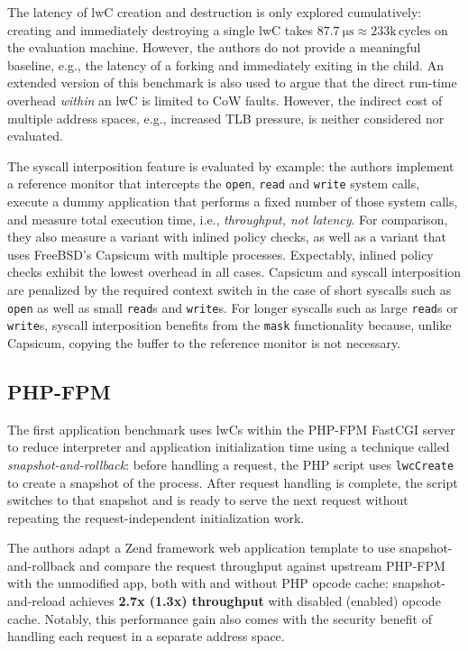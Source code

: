 \documentclass[10pt,twocolumn,a4paper]{article}
\begin{document}
The latency of lwC creation and destruction is only explored cumulatively: creating and immediately destroying a single lwC takes $\SI{87.7}{\micro\second} \approx 233\text{k}\,\text{cycles}$ on the evaluation machine. %
However, the authors do not provide a meaningful baseline, e.g., the latency of a forking and immediately exiting in the child.
An extended version of this benchmark is also used to argue that the direct run-time overhead \textit{within} an lwC is limited to CoW faults.
However, the indirect cost of multiple address spaces, e.g., increased TLB pressure, is neither considered nor evaluated.
\cite{lwcpaper}

The syscall interposition feature is evaluated by example:
the authors implement a reference monitor that intercepts the \lstinline{open}, \lstinline{read} and \lstinline{write} system calls, execute a dummy application that performs a fixed number of those system calls, and measure total execution time, i.e., \textit{throughput, not latency}.
For comparison, they also measure a variant with inlined policy checks, as well as a variant that uses FreeBSD's Capsicum with multiple processes.
Expectably, inlined policy checks exhibit the lowest overhead in all cases.
Capsicum and syscall interposition are penalized by the required context switch in the case of short syscalls such as \lstinline{open} as well as small \lstinline{read}s and \lstinline{write}s.
For longer syscalls such as large \lstinline{read}s or \lstinline{write}s, syscall interposition benefits from the \lstinline{mask} functionality because, unlike Capsicum, copying the buffer to the reference monitor is not necessary.
\cite{lwcpaper}

\subsection{PHP-FPM}
The first application benchmark uses lwCs within the PHP-FPM FastCGI server to reduce interpreter and application initialization time using a technique called \textit{snapshot-and-rollback}:
before handling a request, the PHP script uses \lstinline{lwcCreate} to create a snapshot of the process.
After request handling is complete, the script switches to that snapshot and is ready to serve the next request without repeating the request-independent initialization work.
\cite{lwcpaper}

The authors adapt a Zend framework web application template to use snapshot-and-rollback and compare the request throughput against upstream PHP-FPM with the unmodified app, both with and without PHP opcode cache:
snapshot-and-reload achieves \textbf{2.7x (1.3x) throughput} with disabled (enabled) opcode cache.
Notably, this performance gain also comes with the security benefit of handling each request in a separate address space.\cite{zend,lwcpaper}
\end{document}
